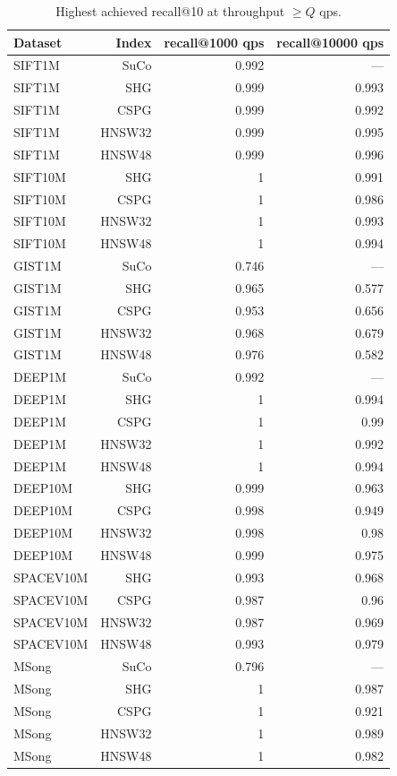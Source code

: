 \begin{table}[t]
\centering
\small
\caption{Highest achieved recall@10 at throughput \(\geq Q\) qps.}
\label{tab:recall-at-qps-k10}
\begin{tabular}{lrrr}
\toprule
Dataset & Index & recall@1000 qps & recall@10000 qps \\
\midrule
SIFT1M & SuCo & 0.992 & — \\
SIFT1M & SHG & 0.999 & 0.993 \\
SIFT1M & CSPG & 0.999 & 0.992 \\
SIFT1M & HNSW32 & 0.999 & 0.995 \\
SIFT1M & HNSW48 & 0.999 & 0.996 \\
SIFT10M & SHG & 1 & 0.991 \\
SIFT10M & CSPG & 1 & 0.986 \\
SIFT10M & HNSW32 & 1 & 0.993 \\
SIFT10M & HNSW48 & 1 & 0.994 \\
GIST1M & SuCo & 0.746 & — \\
GIST1M & SHG & 0.965 & 0.577 \\
GIST1M & CSPG & 0.953 & 0.656 \\
GIST1M & HNSW32 & 0.968 & 0.679 \\
GIST1M & HNSW48 & 0.976 & 0.582 \\
DEEP1M & SuCo & 0.992 & — \\
DEEP1M & SHG & 1 & 0.994 \\
DEEP1M & CSPG & 1 & 0.99 \\
DEEP1M & HNSW32 & 1 & 0.992 \\
DEEP1M & HNSW48 & 1 & 0.994 \\
DEEP10M & SHG & 0.999 & 0.963 \\
DEEP10M & CSPG & 0.998 & 0.949 \\
DEEP10M & HNSW32 & 0.998 & 0.98 \\
DEEP10M & HNSW48 & 0.999 & 0.975 \\
SPACEV10M & SHG & 0.993 & 0.968 \\
SPACEV10M & CSPG & 0.987 & 0.96 \\
SPACEV10M & HNSW32 & 0.987 & 0.969 \\
SPACEV10M & HNSW48 & 0.993 & 0.979 \\
MSong & SuCo & 0.796 & — \\
MSong & SHG & 1 & 0.987 \\
MSong & CSPG & 1 & 0.921 \\
MSong & HNSW32 & 1 & 0.989 \\
MSong & HNSW48 & 1 & 0.982 \\

\end{tabular}
\end{table}
